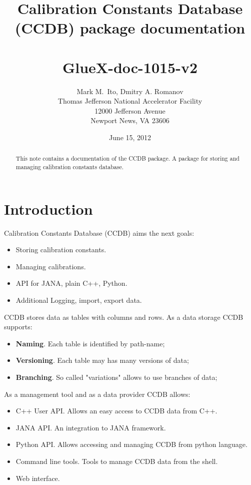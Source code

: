 \documentclass{article}
\title{Calibration Constants Database (CCDB) package documentation \\
~\\
\large GlueX-doc-1015-v2
}
\author{Mark M.\ Ito, Dmitry A. Romanov \\
Thomas Jefferson National Accelerator Facility \\
12000 Jefferson Avenue \\
Newport News, VA 23606
}
\date{June 15, 2012}
\begin{document}


\maketitle

\begin{abstract}
This note contains a documentation of the CCDB package. A package for storing 
and managing calibration constants database.
\end{abstract}

\tableofcontents


\newpage
\section{Introduction}

%

Calibration Constants Database (CCDB) aims the next goals:
\begin{itemize}
  \item Storing calibration constants.
  \item Managing calibrations.
  \item API for JANA, plain C++, Python.
  \item Additional Logging, import, export data.
\end{itemize}
\vspace{1 em}

CCDB stores data as tables with columns and rows. As a data storage CCDB supports:
\begin{itemize}
\item \textbf{Naming}. Each table is identified by path-name;
\item \textbf{Versioning}. Each table may has many versions of data;
\item \textbf{Branching}. So called "variations" allows to use branches of data;
\end{itemize}
\vspace{1 em}

As a management tool and as a data provider CCDB allows:
\begin{itemize}
\item C++ User API. Allows an easy access to CCDB data from C++.
\item JANA API. An integration to JANA framework.
\item Python API. Allows accessing and managing CCDB from python language.
\item Command line tools. Tools to manage CCDB data from the shell.
\item Web interface.
\end{itemize}
\vspace{1 em}
\end{document}
